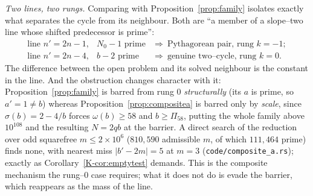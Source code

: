 \documentclass[11pt]{article}
\theoremstyle{definition}
\begin{document}
\emph{Two lines, two rungs.} Comparing with Proposition~\ref{prop:family} isolates exactly what separates the cycle from its
neighbour. Both are ``a member of a slope--two line whose shifted predecessor is prime'':
\[
\begin{array}{lll}
\text{line } n'=2n-1, & N_0-1 \text{ prime} & \Longrightarrow\ \text{Pythagorean pair, rung } k=-1;\\
\text{line } n'=2n-4, & b-2 \text{ prime}   & \Longrightarrow\ \text{genuine two--cycle, rung } k=0.
\end{array}
\]
The difference between the open problem and its solved neighbour is the constant in the line. And the
obstruction changes character with it: Proposition~\ref{prop:family} is barred from rung $0$
\emph{structurally} (its $a$ is prime, so $a'=1\ne b$) whereas Proposition~\ref{prop:compositea}
is barred only by \emph{scale}, since $\sigma(b)=2-4/b$ forces $\omega(b)\ge58$ and $b\ge\Pi_{58}$,
putting the whole family above $10^{108}$ and the resulting $N=2qb$ at the barrier. A direct search of
the reduction over odd squarefree $m\le2\times10^6$ ($810{,}590$ admissible $m$, of which $111{,}464$
prime) finds none, with nearest miss $|b'-2m|=5$ at $m=3$ (\texttt{code/composite\_a.rs}); exactly
as Corollary~\ref{K-cor:emptytest} demands. This is the composite mechanism the rung--$0$ case requires;
what it does not do is evade the barrier, which reappears as the mass of the line.
\end{document}
